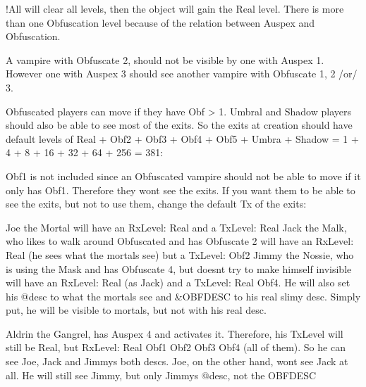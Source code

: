 \documentclass[letterpaper,10pt,english]{sphinxmanual}
\begin{document}
\sphinxAtStartPar
!All will clear all levels, then the object will gain the Real level.
There is more than one Obfuscation level because of the relation between
Auspex and Obfuscation.

\sphinxAtStartPar
A vampire with Obfuscate 2, should not be visible by one with Auspex 1.
However one with Auspex 3 should see another vampire with Obfuscate 1, 2
/or/ 3.

\sphinxAtStartPar
Obfuscated players can move if they have Obf \textgreater{} 1. Umbral and Shadow players
should also be able to see most of the exits. So the exits at creation
should have default levels of Real + Obf2 + Obf3 + Obf4 + Obf5 + Umbra +
Shadow = 1 + 4 + 8 + 16 + 32 + 64 + 256 = 381:

\begin{sphinxVerbatim}[commandchars=\\\{\}]
 
 
\end{sphinxVerbatim}

\sphinxAtStartPar
Obf1 is not included since an Obfuscated vampire should not be able to move
if it only has Obf1. Therefore they won\textquotesingle{}t see the exits. If you want them
to be able to see the exits, but not to use them, change the default Tx of
the exits:

\begin{sphinxVerbatim}[commandchars=\\\{\}]
 
 
\end{sphinxVerbatim}

\sphinxAtStartPar
Joe the Mortal will have an RxLevel: Real and a TxLevel: Real
Jack the Malk, who likes to walk around Obfuscated and has Obfuscate 2 will
have an RxLevel: Real (he sees what the mortals see) but a TxLevel: Obf2
Jimmy the Nossie, who is using the Mask and has Obfuscate 4, but doesn\textquotesingle{}t
try to make himself invisible will have an RxLevel: Real (as Jack)
and a TxLevel: Real Obf4. He will also set his @desc to what the mortals see and
\&OBFDESC to his real slimy desc. Simply put, he will be visible to mortals,
but not with his real desc.

\sphinxAtStartPar
Aldrin the Gangrel, has Auspex 4 and activates it. Therefore, his TxLevel
will still be Real, but RxLevel: Real Obf1 Obf2 Obf3 Obf4 (all of them). So
he can see Joe, Jack and Jimmy\textquotesingle{}s both descs.
Joe, on the other hand, won\textquotesingle{}t see Jack at all. He will still see Jimmy, but
only Jimmy\textquotesingle{}s @desc, not the OBFDESC
\end{document}
